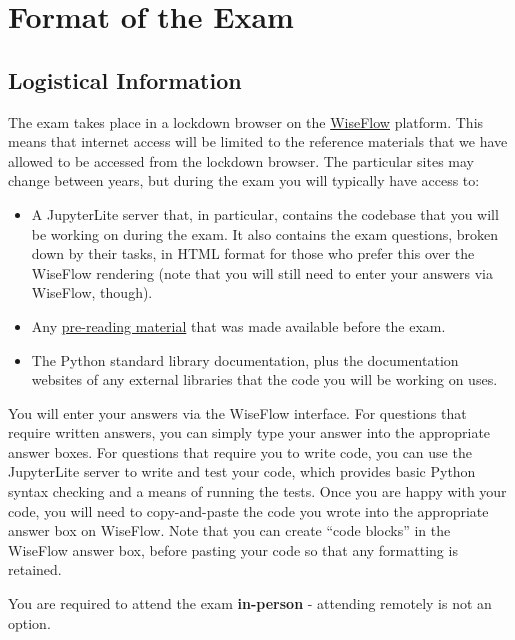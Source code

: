 \section{Format of the Exam}

\subsection{Logistical Information}

The exam takes place in a lockdown browser on the \href{https://ucldata.atlassian.net/wiki/spaces/ELearningStudentSupport/pages/63340834/WISEflow+AssessmentUCL+guidance+for+students}{WiseFlow} platform.
This means that internet access will be limited to the reference materials that we have allowed to be accessed from the lockdown browser.
The particular sites may change between years, but during the exam you will typically have access to:

\begin{itemize}
  \item A JupyterLite server that, in particular, contains the codebase that you will be working on during the exam.
        It also contains the exam questions, broken down by their tasks, in HTML format for those who prefer this over the WiseFlow rendering (note that you will still need to enter your answers via WiseFlow, though).
  \item Any \hyperref[sec:pre-reading-material]{pre-reading material} that was made available before the exam.
  \item The Python standard library documentation, plus the documentation websites of any external libraries that the code you will be working on uses.
\end{itemize}

You will enter your answers via the WiseFlow interface.
For questions that require written answers, you can simply type your answer into the appropriate answer boxes.
For questions that require you to write code, you can use the JupyterLite server to write and test your code, which provides basic Python syntax checking and a means of running the tests.
Once you are happy with your code, you will need to copy-and-paste the code you wrote into the appropriate answer box on WiseFlow.
Note that you can create ``code blocks'' in the WiseFlow answer box, before pasting your code so that any formatting is retained.

You are required to attend the exam \textbf{in-person} - attending remotely is not an option.

